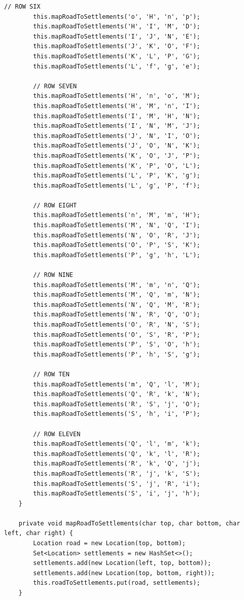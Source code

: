\documentclass{fank1basedocument}
\begin{document}
\begin{lstlisting}[style=javacode,language=myJava]
		// ROW SIX
		this.mapRoadToSettlements('o', 'H', 'n', 'p');
		this.mapRoadToSettlements('H', 'I', 'M', 'D');
		this.mapRoadToSettlements('I', 'J', 'N', 'E');
		this.mapRoadToSettlements('J', 'K', 'O', 'F');
		this.mapRoadToSettlements('K', 'L', 'P', 'G');
		this.mapRoadToSettlements('L', 'f', 'g', 'e');

		// ROW SEVEN
		this.mapRoadToSettlements('H', 'n', 'o', 'M');
		this.mapRoadToSettlements('H', 'M', 'n', 'I');
		this.mapRoadToSettlements('I', 'M', 'H', 'N');
		this.mapRoadToSettlements('I', 'N', 'M', 'J');
		this.mapRoadToSettlements('J', 'N', 'I', 'O');
		this.mapRoadToSettlements('J', 'O', 'N', 'K');
		this.mapRoadToSettlements('K', 'O', 'J', 'P');
		this.mapRoadToSettlements('K', 'P', 'O', 'L');
		this.mapRoadToSettlements('L', 'P', 'K', 'g');
		this.mapRoadToSettlements('L', 'g', 'P', 'f');

		// ROW EIGHT
		this.mapRoadToSettlements('n', 'M', 'm', 'H');
		this.mapRoadToSettlements('M', 'N', 'Q', 'I');
		this.mapRoadToSettlements('N', 'O', 'R', 'J');
		this.mapRoadToSettlements('O', 'P', 'S', 'K');
		this.mapRoadToSettlements('P', 'g', 'h', 'L');

		// ROW NINE
		this.mapRoadToSettlements('M', 'm', 'n', 'Q');
		this.mapRoadToSettlements('M', 'Q', 'm', 'N');
		this.mapRoadToSettlements('N', 'Q', 'M', 'R');
		this.mapRoadToSettlements('N', 'R', 'Q', 'O');
		this.mapRoadToSettlements('O', 'R', 'N', 'S');
		this.mapRoadToSettlements('O', 'S', 'R', 'P');
		this.mapRoadToSettlements('P', 'S', 'O', 'h');
		this.mapRoadToSettlements('P', 'h', 'S', 'g');

		// ROW TEN
		this.mapRoadToSettlements('m', 'Q', 'l', 'M');
		this.mapRoadToSettlements('Q', 'R', 'k', 'N');
		this.mapRoadToSettlements('R', 'S', 'j', 'O');
		this.mapRoadToSettlements('S', 'h', 'i', 'P');

		// ROW ELEVEN
		this.mapRoadToSettlements('Q', 'l', 'm', 'k');
		this.mapRoadToSettlements('Q', 'k', 'l', 'R');
		this.mapRoadToSettlements('R', 'k', 'Q', 'j');
		this.mapRoadToSettlements('R', 'j', 'k', 'S');
		this.mapRoadToSettlements('S', 'j', 'R', 'i');
		this.mapRoadToSettlements('S', 'i', 'j', 'h');
	}

	private void mapRoadToSettlements(char top, char bottom, char left, char right) {
		Location road = new Location(top, bottom);
		Set<Location> settlements = new HashSet<>();
		settlements.add(new Location(left, top, bottom));
		settlements.add(new Location(top, bottom, right));
		this.roadToSettlements.put(road, settlements);
	}


\end{lstlisting}
\end{document}
